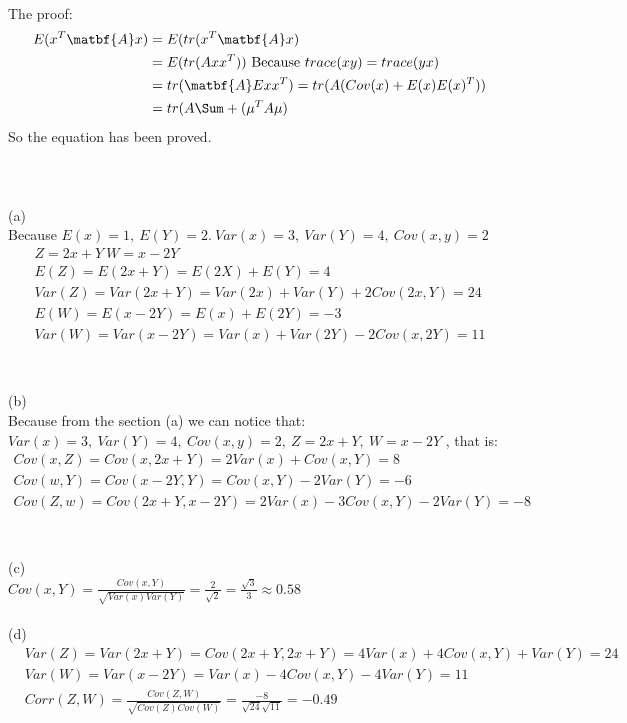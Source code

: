 \documentclass[11pt]{article}
\begin{document}
  \paragraph{\color{red}{Question Five Answer:}}The proof: \\
  \begin{align*}
    E(x^T\matbf{A}x) &= E(tr(x^T\matbf{A}x)\\
    &= E(tr(Axx^T)) \text{ Because } trace(xy) = trace(yx) \\
    &= tr(\matbf{A}Exx^T) = tr(A(Cov(x) + E(x)E(x)^T))\\
    &= tr(A\Sum + (\mu^TA\mu)
  \end{align*}
  So the equation has been proved.
  \paragraph{\color{red}{Question Six Answer:}}
  \\
  \\
  (a) \\
  Because $E(x) = 1, \ E(Y) = 2. \ Var(x) = 3, \ Var(Y) = 4, \ Cov(x,y) = 2$ \\
  \begin{align*}
    Z = 2x + Y \ W = x - 2Y \\
    E(Z) = E(2x + Y) = E(2X) + E(Y) = 4 \\
    Var(Z) = Var(2x + Y) = Var(2x) + Var(Y) + 2Cov(2x,Y) = 24\\
    E(W) = E(x - 2Y) = E(x) + E(2Y) = -3 \\
    Var(W) = Var(x - 2Y) = Var(x) + Var(2Y) - 2Cov(x,2Y) = 11\\
  \end{align*}
  \\
  \\
  (b) \\
  Because from the section (a) we can notice that: $Var(x) = 3, \ Var(Y) = 4, \ Cov(x,y) = 2, \ Z = 2x + Y, \ W = x - 2Y$ , that is:
  \begin{align*}
    Cov(x,Z) = Cov(x, 2x + Y) = 2Var(x) + Cov(x,Y) = 8 \\
    Cov(w,Y) = Cov(x-2Y, Y) = Cov(x,Y) - 2Var(Y) = -6 \\
    Cov(Z,w) = Cov(2x + Y, x-2Y) = 2Var(x) - 3Cov(x,Y) - 2 Var(Y) = -8 \\
  \end{align*}
  \\
  \\
  (c) \\
  $Cov(x,Y) = \frac{Cov(x,Y)}{\sqrt{Var(x) Var(Y)}} = \frac{2}{\sqrt{2}} = \frac{\sqrt{3}}{3} \approx 0.58 $
  \\
  \\
  (d) \\
  \begin{align*}
    &Var(Z) = Var(2x + Y) = Cov(2x + Y, 2x + Y) = 4Var(x) + 4Cov(x,Y) + Var(Y) = 24 \\
    &Var(W) = Var(x - 2Y) = Var(x) - 4Cov(x,Y) - 4Var(Y) = 11 \\
    &Corr(Z,W) = \frac{Cov(Z,W)}{\sqrt{Cov(Z)Cov(W)}} = \frac{-8}{\sqrt{24}\sqrt{11}} = - 0.49
  \end{align*}
\end{document}
